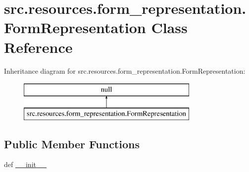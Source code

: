 \hypertarget{classsrc_1_1resources_1_1form__representation_1_1_form_representation}{\section{src.\+resources.\+form\+\_\+representation.\+Form\+Representation Class Reference}
\label{classsrc_1_1resources_1_1form__representation_1_1_form_representation}
}
Inheritance diagram for src.\+resources.\+form\+\_\+representation.\+Form\+Representation\+:\begin{figure}[H]
\begin{center}
\leavevmode
\includegraphics[height=2.000000cm]{classsrc_1_1resources_1_1form__representation_1_1_form_representation}
\end{center}
\end{figure}
\subsection*{Public Member Functions}
\begin{DoxyCompactItemize}
\item 
def \hyperlink{classsrc_1_1resources_1_1form__representation_1_1_form_representation_af4e9aa697d7a55c868381620368ff929}{\+\_\+\+\_\+init\+\_\+\+\_\+}
\end{DoxyCompactItemize}
